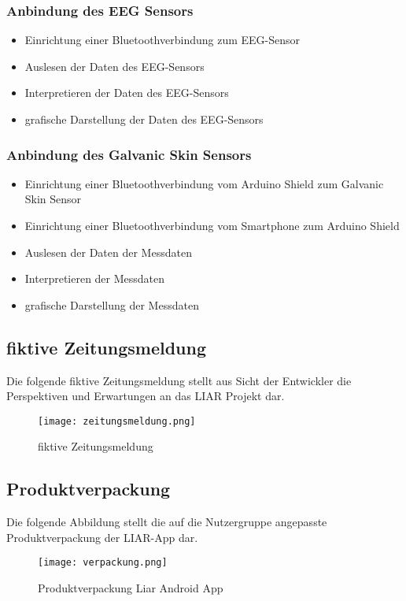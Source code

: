 	\subsubsection{Anbindung des EEG Sensors}
	\begin{itemize}
	\item{}Einrichtung einer Bluetoothverbindung zum EEG-Sensor
	\item{}Auslesen der Daten des EEG-Sensors
	\item{}Interpretieren der Daten des EEG-Sensors
	\item{}grafische Darstellung der Daten des EEG-Sensors
	\end{itemize}
	\subsubsection{Anbindung des Galvanic Skin Sensors}
	\begin{itemize}
	\item{}Einrichtung einer Bluetoothverbindung vom Arduino Shield zum Galvanic Skin Sensor
	\item{}Einrichtung einer Bluetoothverbindung vom Smartphone zum Arduino Shield
	\item{}Auslesen der Daten der Messdaten
	\item{}Interpretieren der Messdaten
	\item{}grafische Darstellung der Messdaten
	\end{itemize}
   	

	\newpage
   	\subsection{fiktive Zeitungsmeldung}
   	Die folgende fiktive Zeitungsmeldung stellt aus Sicht der Entwickler die Perspektiven und Erwartungen an das LIAR Projekt dar. 
	\begin{figure}[ht!]
		\begin{center}
			\texttt{[image: zeitungsmeldung.png]}
		\end{center}
		\caption[Zeitungsmeldung]{fiktive Zeitungsmeldung}
	\label{fig:zeitungsmeldung}
	\end{figure}   


   	\subsection{Produktverpackung}
   	Die folgende Abbildung stellt die auf die Nutzergruppe angepasste Produktverpackung der LIAR-App dar.
	\begin{figure}[ht!]
	\begin{center}
		\texttt{[image: verpackung.png]}
	\end{center}
	\caption[Produktverpackung]{Produktverpackung Liar Android App}
	\label{fig:verpackung}
	\end{figure}   
